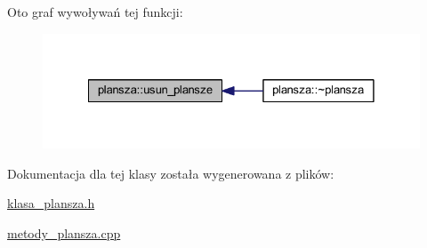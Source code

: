 Oto graf wywoływań tej funkcji\+:
\nopagebreak
\begin{figure}[H]
\begin{center}
\leavevmode
\includegraphics[width=328pt]{classplansza_afbbb011300c83927a042e5d2c0a6820d_icgraph}
\end{center}
\end{figure}


Dokumentacja dla tej klasy została wygenerowana z plików\+:\begin{DoxyCompactItemize}
\item 
\mbox{\hyperlink{klasa__plansza_8h}{klasa\+\_\+plansza.\+h}}\item 
\mbox{\hyperlink{metody__plansza_8cpp}{metody\+\_\+plansza.\+cpp}}\end{DoxyCompactItemize}
